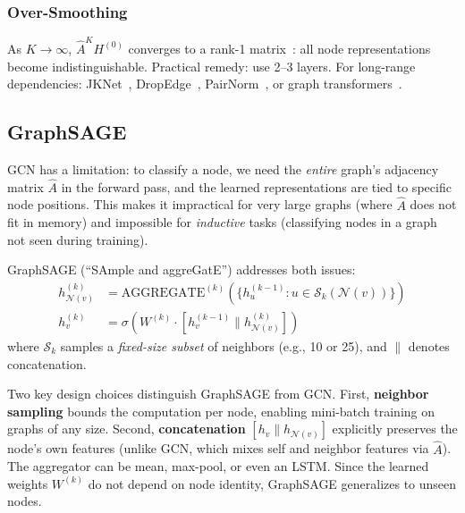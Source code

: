\begin{notechapter}
\subsubsection{Over-Smoothing}

\begin{warningbox}
As $K \to \infty$, $\hat{A}^K H^{(0)}$ converges to a rank-1
matrix~\cite{semi-supervised-graphs:li2018deeper}: all node representations become indistinguishable.
Practical remedy: use 2--3 layers. For long-range dependencies:
JKNet~\cite{semi-supervised-graphs:xu2018representation}, DropEdge~\cite{semi-supervised-graphs:rong2020dropedge},
PairNorm~\cite{semi-supervised-graphs:zhao2020pairnorm}, or graph transformers~\cite{semi-supervised-graphs:ying2021transformers}.
\end{warningbox}

\subsection{GraphSAGE~\cite{semi-supervised-graphs:hamilton2017}}

GCN has a limitation: to classify a node, we need the \emph{entire} graph's
adjacency matrix $\hat{A}$ in the forward pass, and the learned representations
are tied to specific node positions. This makes it impractical for very large
graphs (where $\hat{A}$ does not fit in memory) and impossible for
\emph{inductive} tasks (classifying nodes in a graph not seen during training).

GraphSAGE (``SAmple and aggreGatE'') addresses both issues:
\begin{align}
h_{\mathcal{N}(v)}^{(k)} &= \text{AGGREGATE}^{(k)}(
  \{h_u^{(k-1)}: u \in \mathcal{S}_k(\mathcal{N}(v))\}) \\
h_v^{(k)} &= \sigma(W^{(k)}\cdot[h_v^{(k-1)} \| h_{\mathcal{N}(v)}^{(k)}])
\end{align}
where $\mathcal{S}_k$ samples a \emph{fixed-size subset} of neighbors
(e.g., 10 or 25), and $\|$ denotes concatenation.

Two key design choices distinguish GraphSAGE from GCN. First,
\textbf{neighbor sampling} bounds the computation per node, enabling
mini-batch training on graphs of any size. Second, \textbf{concatenation}
$[h_v \| h_{\mathcal{N}(v)}]$ explicitly preserves the node's own features
(unlike GCN, which mixes self and neighbor features via $\hat{A}$). The
aggregator can be mean, max-pool, or even an LSTM. Since the learned weights
$W^{(k)}$ do not depend on node identity, GraphSAGE generalizes to unseen nodes.


\end{notechapter}
